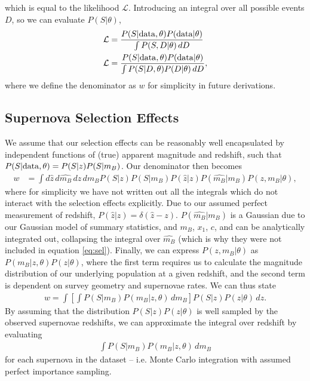 \documentclass[a4paper,fleqn,usenatbib]{mnras}
\begin{document}
which is equal to the likelihood $\mathcal{L}$. Introducing an integral over all possible events $D$, so we can evaluate $P(S|\theta)$, 
\begin{align}
\mathcal{L}&= \frac{P(S|{\rm data},\theta) P({\rm data}|\theta)}{\int P(S, D|\theta)\, dD} \\
\mathcal{L} &= \frac{P(S|{\rm data},\theta) P({\rm data}|\theta)}{\int P(S | D, \theta) P(D|\theta)\, dD}, \label{eq:app_main}
\end{align}
where we define the denominator as $w$ for simplicity in future derivations.



\subsection{Supernova Selection Effects}

We assume that our selection effects can be reasonably well encapsulated by independent functions of (true) apparent magnitude and redshift, such that $P(S|{\rm data}, \theta) = P(S|z) P(S|m_B)$. Our denominator then becomes
\begin{align}
w &= \int d\hat{z} \, d\hat{m_B} \, dz \, dm_B P(S|z) P(S|m_B) P(\hat{z}|z) P(\hat{m_B}|m_B) P(z, m_B | \theta), \label{eq:sel}
\end{align}
where for simplicity we have not written out all the integrals which do not interact with the selection effects explicitly. Due to our assumed perfect measurement of redshift, $P(\hat{z}|z) = \delta(\hat{z} - z)$. $P(\hat{m_B} | m_B)$ is a Gaussian due to our Gaussian model of summary statistics, and $m_B$, $x_1$, $c$, and can be analytically integrated out, collapsing the integral over $\hat{m_B}$ (which is why they were not included in equation \eqref{eq:sel}). Finally, we can express $P(z, m_B | \theta)$ as  $P(m_B | z, \theta) P(z | \theta)$, where the first term requires us to calculate the magnitude distribution of our underlying population at a given redshift, and the second term is dependent on survey geometry and supernovae rates. We can thus state
\begin{align}
w = \int \left[ \int P(S|m_B) P(m_B | z, \theta)\, dm_B \right] P(S|z)P(z|\theta)\, dz.
\end{align}
By assuming that the distribution $P(S|z)P(z|\theta)$ is well sampled by the observed supernovae redshifts, we can approximate the integral over redshift by evaluating
\begin{align}
\int P(S|m_B) P(m_B | z, \theta)\, dm_B \label{eq:selint}
\end{align}
for each supernova in the dataset -- i.e. Monte Carlo integration with assumed perfect importance sampling.
\end{document}
